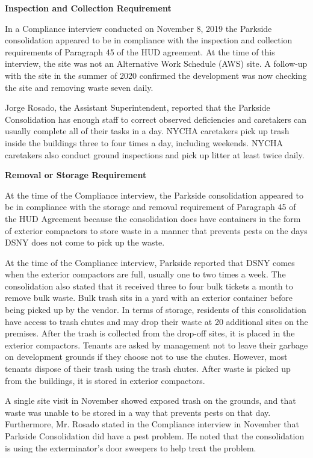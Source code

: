 

\textbf{Inspection and Collection Requirement}

In a Compliance interview conducted on November 8, 2019 the Parkside consolidation appeared to be in compliance with the inspection and collection requirements of Paragraph 45 of the HUD agreement. At the time of this interview, the site was not an Alternative Work Schedule (AWS) site. A follow-up with the site in the summer of 2020 confirmed the development was now checking the site and removing waste seven daily.

Jorge Rosado, the Assistant Superintendent, reported that the Parkside Consolidation has enough staff to correct observed deficiencies and caretakers can usually complete all of their tasks in a day. NYCHA caretakers pick up trash inside the buildings three to four times a day, including weekends. NYCHA caretakers also conduct ground inspections and pick up litter at least twice daily. 

\textbf{Removal or Storage Requirement}

At the time of the Compliance interview, the Parkside consolidation appeared to be in compliance with the storage and removal requirement of Paragraph 45 of the HUD Agreement because the consolidation does have containers in the form of exterior compactors to store waste in a manner that prevents pests on the days DSNY does not come to pick up the waste.  

At the time of the Compliance interview, Parkside reported that DSNY comes when the exterior compactors are full, usually one to two times a week. The consolidation also stated that it received three to four bulk tickets a month to remove bulk waste. Bulk trash sits in a yard with an exterior container before being picked up by the vendor. In terms of storage, residents of this consolidation have access to trash chutes and may drop their waste at 20 additional sites on the premises. After the trash is collected from the drop-off sites, it is placed in the exterior compactors. Tenants are asked by management not to leave their garbage on development grounds if they choose not to use the chutes. However, most tenants dispose of their trash using the trash chutes. After waste is picked up from the buildings, it is stored in exterior compactors.

A single site visit in November showed exposed trash on the grounds, and that waste was unable to be stored in a way that prevents pests on that day. Furthermore, Mr. Rosado stated in the Compliance interview in November that Parkside Consolidation did have a pest problem. He noted that the consolidation is using the exterminator's door sweepers to help treat the problem.


